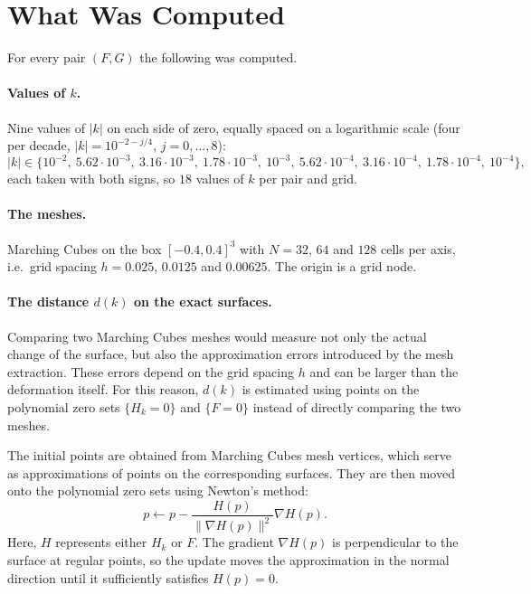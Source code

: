 \documentclass[12pt, a4paper]{article}
\theoremstyle{plain}
\theoremstyle{definition}
\theoremstyle{remark}
\theoremstyle{definition}
\begin{document}
\section{What Was Computed}
\label{sec:r-method}

For every pair $(F,G)$ the following was computed.

\paragraph{Values of $k$.} Nine values of $|k|$ on each side of zero, equally
spaced on a logarithmic scale (four per decade, $|k|=10^{-2-j/4}$, $j=0,\dots,8$):
\[
|k|\in\{10^{-2},\ 5.62\cdot10^{-3},\ 3.16\cdot10^{-3},\ 1.78\cdot10^{-3},\ 10^{-3},\
5.62\cdot10^{-4},\ 3.16\cdot10^{-4},\ 1.78\cdot10^{-4},\ 10^{-4}\},
\]
each taken with both signs, so $18$ values of $k$ per pair and grid.

\paragraph{The meshes.} Marching Cubes on the box $[-0.4,0.4]^3$ with $N=32$, $64$
and $128$ cells per axis, i.e.\ grid spacing $h=0.025$, $0.0125$ and $0.00625$.
The origin is a grid node.



\paragraph{The distance $d(k)$ on the exact surfaces.}
Comparing two Marching Cubes meshes would measure not only the
actual change of the surface, but also the approximation errors
introduced by the mesh extraction. These errors depend on the
grid spacing $h$ and can be larger than the deformation itself.
For this reason, $d(k)$ is estimated using points on the
polynomial zero sets $\{H_k=0\}$ and $\{F=0\}$ instead of
directly comparing the two meshes.

The initial points are obtained from Marching Cubes mesh vertices,
which serve as approximations of points on the corresponding
surfaces. They are then moved onto the polynomial zero sets using
Newton's method:
\[
p\leftarrow p-\frac{H(p)}{\|\nabla H(p)\|^2}\nabla H(p).
\]
Here, $H$ represents either $H_k$ or $F$. The gradient
$\nabla H(p)$ is perpendicular to the surface at regular points,
so the update moves the approximation in the normal direction
until it sufficiently satisfies $H(p)=0$.
\end{document}
